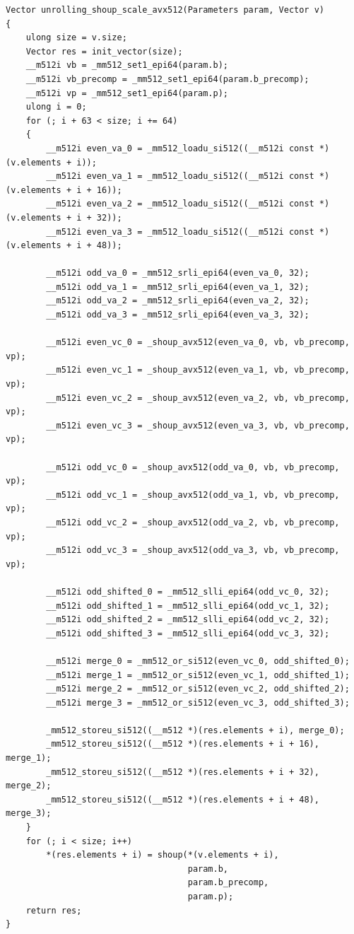 \documentclass{article}
\begin{document}
\begin{lstlisting}[caption = Implementation of unrolling Shoup's modular reduction]
Vector unrolling_shoup_scale_avx512(Parameters param, Vector v)
{
    ulong size = v.size;
    Vector res = init_vector(size);
    __m512i vb = _mm512_set1_epi64(param.b);
    __m512i vb_precomp = _mm512_set1_epi64(param.b_precomp);
    __m512i vp = _mm512_set1_epi64(param.p);
    ulong i = 0;
    for (; i + 63 < size; i += 64)
    {
        __m512i even_va_0 = _mm512_loadu_si512((__m512i const *)(v.elements + i));
        __m512i even_va_1 = _mm512_loadu_si512((__m512i const *)(v.elements + i + 16));
        __m512i even_va_2 = _mm512_loadu_si512((__m512i const *)(v.elements + i + 32));
        __m512i even_va_3 = _mm512_loadu_si512((__m512i const *)(v.elements + i + 48));

        __m512i odd_va_0 = _mm512_srli_epi64(even_va_0, 32);
        __m512i odd_va_1 = _mm512_srli_epi64(even_va_1, 32);
        __m512i odd_va_2 = _mm512_srli_epi64(even_va_2, 32);
        __m512i odd_va_3 = _mm512_srli_epi64(even_va_3, 32);

        __m512i even_vc_0 = _shoup_avx512(even_va_0, vb, vb_precomp, vp);
        __m512i even_vc_1 = _shoup_avx512(even_va_1, vb, vb_precomp, vp);
        __m512i even_vc_2 = _shoup_avx512(even_va_2, vb, vb_precomp, vp);
        __m512i even_vc_3 = _shoup_avx512(even_va_3, vb, vb_precomp, vp);

        __m512i odd_vc_0 = _shoup_avx512(odd_va_0, vb, vb_precomp, vp);
        __m512i odd_vc_1 = _shoup_avx512(odd_va_1, vb, vb_precomp, vp);
        __m512i odd_vc_2 = _shoup_avx512(odd_va_2, vb, vb_precomp, vp);
        __m512i odd_vc_3 = _shoup_avx512(odd_va_3, vb, vb_precomp, vp);

        __m512i odd_shifted_0 = _mm512_slli_epi64(odd_vc_0, 32);
        __m512i odd_shifted_1 = _mm512_slli_epi64(odd_vc_1, 32);
        __m512i odd_shifted_2 = _mm512_slli_epi64(odd_vc_2, 32);
        __m512i odd_shifted_3 = _mm512_slli_epi64(odd_vc_3, 32);

        __m512i merge_0 = _mm512_or_si512(even_vc_0, odd_shifted_0);
        __m512i merge_1 = _mm512_or_si512(even_vc_1, odd_shifted_1);
        __m512i merge_2 = _mm512_or_si512(even_vc_2, odd_shifted_2);
        __m512i merge_3 = _mm512_or_si512(even_vc_3, odd_shifted_3);

        _mm512_storeu_si512((__m512 *)(res.elements + i), merge_0);
        _mm512_storeu_si512((__m512 *)(res.elements + i + 16), merge_1);
        _mm512_storeu_si512((__m512 *)(res.elements + i + 32), merge_2);
        _mm512_storeu_si512((__m512 *)(res.elements + i + 48), merge_3);
    }
    for (; i < size; i++)
        *(res.elements + i) = shoup(*(v.elements + i),
                                    param.b,
                                    param.b_precomp,
                                    param.p);
    return res;
}
\end{lstlisting}
\end{document}
